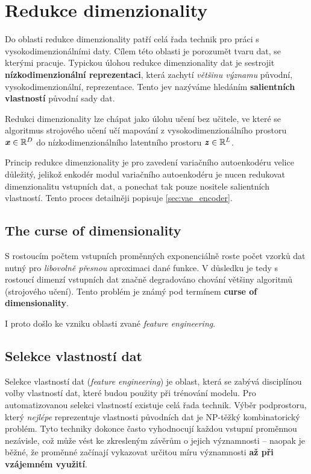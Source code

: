 \section{Redukce dimenzionality}
\label{sec:dimensionality_reduction}

Do oblasti redukce dimenzionality patří celá řada technik pro práci s vysokodimenzionálními daty.
Cílem této oblasti je porozumět tvaru dat, se kterými pracuje.
Typickou úlohou redukce dimenzionality dat je sestrojit \textbf{nízkodimenzionální reprezentaci}, která zachytí \emph{většinu významu} původní, vysokodimenzionální, reprezentace.
Tento jev nazýváme hledáním \textbf{salientních vlastností} původní sady dat. \cite{Phillips2021}

Redukci dimenzionality lze chápat jako úlohu učení bez učitele, ve které se algoritmus strojového učení učí mapování z vysokodimenzionálního prostoru $\textbf{\emph{x}} \in \mathbb{R}^D$ do nízkodimenzionálního latentního prostoru $\textbf{\emph{z}} \in \mathbb{R}^L$. \cite{Murphy2022}

Princip redukce dimenzionality je pro zavedení variačního autoenkodéru velice důležitý, jelikož enkodér modul variačního autoenkodéru je nucen redukovat dimenzionalitu vstupních dat, a ponechat tak pouze nositele salientních vlastností. Tento proces detailněji popisuje \autoref{sec:vae_encoder}.

\subsection{The curse of dimensionality}
S rostoucím počtem vstupních proměnných exponenciálně roste počet vzorků dat nutný pro \emph{libovolně přesnou} aproximaci dané funkce.
V důsledku je tedy s rostoucí dimenzí vstupních dat značně degradováno chování většiny algoritmů (strojového učení).
Tento problém je známý pod termínem \textbf{curse of dimensionality}. \cite{Bellman1957}

I proto došlo ke vzniku oblasti zvané \emph{feature engineering}.
\subsection{Selekce vlastností dat}

Selekce vlastností dat (\emph{feature engineering}) je oblast, která se zabývá disciplínou volby vlastností dat, které budou použity při trénování modelu.
Pro automatizovanou selekci vlastností existuje celá řada technik.
Výběr podprostoru, který \emph{nejlépe} reprezentuje vlastnosti původních dat je NP-těžký kombinatorický problém.
Tyto techniky dokonce často vyhodnocují každou vstupní proměnnou nezávisle, což může vést ke zkresleným závěrům o jejich významnosti – naopak je běžné, že proměnné začínají vykazovat určitou míru významnosti \textbf{až při vzájemném využití}. \cite{Stanczyk2015}

